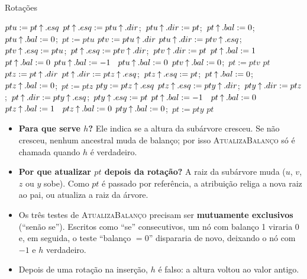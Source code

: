 \begin{pseudo}{Rotações}
\begin{algorithmic}
  \State $ptu:=pt\mathbin{\uparrow}.esq$
   
    \State $pt\mathbin{\uparrow}.esq:=ptu\mathbin{\uparrow}.dir$;\ $ptu\mathbin{\uparrow}.dir:=pt$;\ $pt\mathbin{\uparrow}.bal:=0$;\ $ptu\mathbin{\uparrow}.bal:=0$;\ $pt:=ptu$
  \Else {}
    \State $ptv:=ptu\mathbin{\uparrow}.dir$
    \State $ptu\mathbin{\uparrow}.dir:=ptv\mathbin{\uparrow}.esq$;\ $ptv\mathbin{\uparrow}.esq:=ptu$;\ $pt\mathbin{\uparrow}.esq:=ptv\mathbin{\uparrow}.dir$;\ $ptv\mathbin{\uparrow}.dir:=pt$
     $pt\mathbin{\uparrow}.bal:=1$ \Else\ $pt\mathbin{\uparrow}.bal:=0$ \EndIf
     $ptu\mathbin{\uparrow}.bal:=-1$ \Else\ $ptu\mathbin{\uparrow}.bal:=0$ \EndIf
    \State $ptv\mathbin{\uparrow}.bal:=0$;\ $pt:=ptv$
  \EndIf
  \State \Return $pt$
\EndFunction
{}
  \State $ptz:=pt\mathbin{\uparrow}.dir$
   
    \State $pt\mathbin{\uparrow}.dir:=ptz\mathbin{\uparrow}.esq$;\ $ptz\mathbin{\uparrow}.esq:=pt$;\ $pt\mathbin{\uparrow}.bal:=0$;\ $ptz\mathbin{\uparrow}.bal:=0$;\ $pt:=ptz$
  \Else {}
    \State $pty:=ptz\mathbin{\uparrow}.esq$
    \State $ptz\mathbin{\uparrow}.esq:=pty\mathbin{\uparrow}.dir$;\ $pty\mathbin{\uparrow}.dir:=ptz$;\ $pt\mathbin{\uparrow}.dir:=pty\mathbin{\uparrow}.esq$;\ $pty\mathbin{\uparrow}.esq:=pt$
     $pt\mathbin{\uparrow}.bal:=-1$ \Else\ $pt\mathbin{\uparrow}.bal:=0$ \EndIf
     $ptz\mathbin{\uparrow}.bal:=1$ \Else\ $ptz\mathbin{\uparrow}.bal:=0$ \EndIf
    \State $pty\mathbin{\uparrow}.bal:=0$;\ $pt:=pty$
  \EndIf
  \State \Return $pt$
\EndFunction
\end{algorithmic}
\end{pseudo}

\begin{cuidado}
\begin{itemize}
  \item \textbf{Para que serve $h$?} Ele indica se a altura da subárvore cresceu. Se não cresceu, nenhum ancestral muda de balanço; por isso \textsc{AtualizaBalanço} só é chamada quando $h$ é verdadeiro.
  \item \textbf{Por que atualizar $pt$ depois da rotação?} A raiz da subárvore muda ($u$, $v$, $z$ ou $y$ sobe). Como $pt$ é passado por referência, a atribuição religa a nova raiz ao pai, ou atualiza a raiz da árvore.
  \item Os três testes de \textsc{AtualizaBalanço} precisam ser \textbf{mutuamente exclusivos} (``senão se''). Escritos como ``se'' consecutivos, um nó com balanço 1 viraria 0 e, em seguida, o teste ``balanço $=0$'' dispararia de novo, deixando o nó com $-1$ e $h$ verdadeiro.
  \item Depois de uma rotação na inserção, $h$ é falso: a altura voltou ao valor antigo.
\end{itemize}
\end{cuidado}

